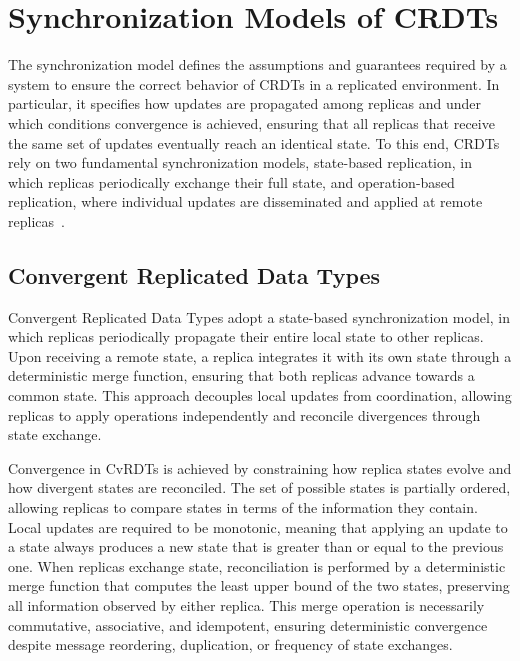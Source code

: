 \section{Synchronization Models of CRDTs}
\label{sec:sync_models}

The synchronization model defines the assumptions and guarantees required by a system to ensure the correct behavior of CRDTs in a replicated environment. In particular, it specifies how updates are propagated among replicas and under which conditions convergence is achieved, ensuring that all replicas that receive the same set of updates eventually reach an identical state. To this end, CRDTs rely on two fundamental synchronization models, state-based replication, in which replicas periodically exchange their full state, and operation-based replication, where individual updates are disseminated and applied at remote replicas~\cite{shapiro2011comprehensive}.

\subsection{Convergent Replicated Data Types}
\label{sub:cvrdts}

Convergent Replicated Data Types adopt a state-based synchronization model, in which replicas periodically propagate their entire local state to other replicas. Upon receiving a remote state, a replica integrates it with its own state through a deterministic merge function, ensuring that both replicas advance towards a common state. This approach decouples local updates from coordination, allowing replicas to apply operations independently and reconcile divergences through state exchange.

Convergence in CvRDTs is achieved by constraining how replica states evolve and how divergent states are reconciled. The set of possible states is partially ordered, allowing replicas to compare states in terms of the information they contain. Local updates are required to be monotonic, meaning that applying an update to a state always produces a new state that is greater than or equal to the previous one. When replicas exchange state, reconciliation is performed by a deterministic merge function that computes the least upper bound of the two states, preserving all information observed by either replica. This merge operation is necessarily commutative, associative, and idempotent, ensuring deterministic convergence despite message reordering, duplication, or frequency of state exchanges.

